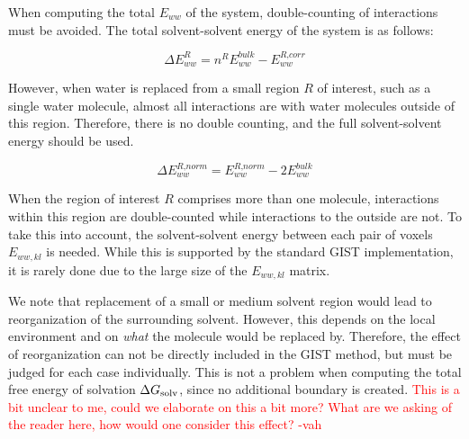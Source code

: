 \documentclass[9pt,tutorial]{livecoms}
\newcommand{\dgsolv}{\Delta G_\textup{solv}}
\newcommand{\todo}{\textcolor{red}}
\begin{document}



When computing the total $E_{ww}$ of the system, double-counting of interactions must be avoided.
The total solvent-solvent energy of the system is as follows:

\begin{equation}
	\Delta E^R_\textit{ww} = n^\textit{R} E^\textit{bulk}_\textit{ww} - E^\textit{R,corr}_\textit{ww}
\end{equation}

However, when water is replaced from a small region $R$ of interest, such as a single water molecule, almost all interactions are with water molecules outside of this region.
Therefore, there is no double counting, and the full solvent-solvent energy should be used.

\begin{equation}
	\Delta E^\textit{R,norm}_\textit{ww} = E^\textit{R,norm}_\textit{ww} - 2E^\textit{bulk}_\textit{ww}
\end{equation}

When the region of interest $R$ comprises more than one molecule, interactions within this region are double-counted while interactions to the outside are not.
To take this into account, the solvent-solvent energy between each pair of voxels $E_{ww,kl}$ is needed.
While this is supported by the standard GIST implementation, it is rarely done due to the large size of the $E_{ww,kl}$ matrix.

We note that replacement of a small or medium solvent region would lead to reorganization of the surrounding solvent.
However, this depends on the local environment and on \emph{what} the molecule would be replaced by.
Therefore, the effect of reorganization can not be directly included in the GIST method, but must be judged for each case individually.
This is not a problem when computing the total free energy of solvation $\dgsolv$, since no additional boundary is created.
\todo{This is a bit unclear to me, could we elaborate on this a bit more? What are we asking of the reader here, how would one consider this effect? -vah}
\end{document}
